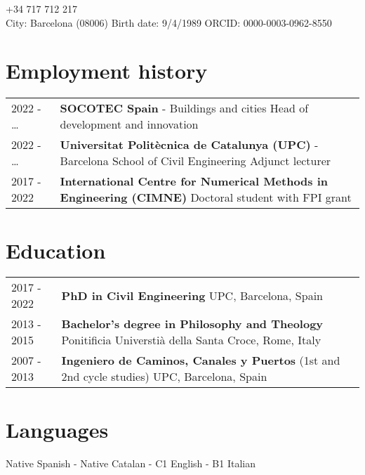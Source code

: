\documentclass[12pt]{article}
\author{Miguel Masó, PhD}
\begin{document}
\maketitle
{} \qquad +34 717 712 217 \\
City: Barcelona (08006) \qquad
Birth date: 9/4/1989 \qquad
ORCID: 0000-0003-0962-8550


\section{Employment history}
\begin{tabularx}{\linewidth}{lX}
    2022 - \enskip \dots &
    \textbf{SOCOTEC Spain} - Buildings and cities \newline
    Head of development and innovation \\

    2022 - \enskip \dots &
    \textbf{Universitat Politècnica de Catalunya (UPC)} - Barcelona School of Civil Engineering \newline
    Adjunct lecturer \\ 

    2017 - 2022 &
    \textbf{International Centre for Numerical Methods in Engineering (CIMNE)} \newline
    Doctoral student with FPI grant \\
\end{tabularx}


\section{Education}
\begin{tabularx}{\linewidth}{lX}
    2017 - 2022 &
    \textbf{PhD in Civil Engineering} \newline
    UPC, Barcelona, Spain \\

    2013 - 2015 &
    \textbf{Bachelor's degree in Philosophy and Theology} \newline
    Ponitificia Universtià della Santa Croce, Rome, Italy \\

    2007 - 2013 &
    \textbf{Ingeniero de Caminos, Canales y Puertos} (1st and 2nd cycle studies) \newline
    UPC, Barcelona, Spain \\
\end{tabularx}


\section{Languages}
Native Spanish - Native Catalan - C1 English - B1 Italian
\end{document}

